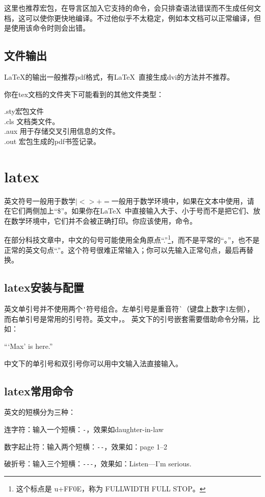 	这里也推荐宏包，在导言区加入它支持的命令，会只排查语法错误而不生成任何文档，这可以使你更快地编译。不过他似乎不太稳定，例如本文档可以正常编译，但是使用该命令时则会出错。
\subsection{文件输出}
	\LaTeX{}的输出一般推荐pdf格式，有\LaTeX\ 直接生成dvi的方法并不推荐。

你在tex文档的文件夹下可能看到的其他文件类型：
\begin{tabbing}
	.sty{\hspace{2em}}\=宏包文件\\%
	.cls	\> 文档类文件。\\
	.aux	\> 用于存储交叉引用信息的文件。\\
	.out	\> 宏包生成的pdf书签记录。
\end{tabbing}
\section{latex}
	英文符号一般用于数学$|<>+=$一般用于数学环境中，如果在文本中使用，请在它们两侧加上“\$”。如果你在\LaTeX\ 中直接输入大于、小于号而不是把它们、放在数学环境中，它们并不会被正确打印。你应该使用，命令。

	在部分科技文章中，中文的句号可能使用全角原点“.”\footnote{这个标点是 u+FF0E，称为 FULLWIDTH FULL STOP。}，而不是平常的“。”，也不是正常的英文句点“.”。这个符号很难正常输入；你可以先输入正常句点，最后再替换。
	\subsection{latex安装与配置}
	英文单引号并不使用两个\verb|'|符号组合。左单引号是重音符\verb|`|（键盘上数字1左侧），而右单引号是常用的引号符。英文中，{\color{cyan}{左双引号就是连续两个重音符号}}。
	英文下的引号嵌套需要借助命令分隔，比如：
\begin{codeshow}[listing side text, listing options={escapeinside=++}]%
``\thinspace`Max' is here.''
\end{codeshow}
中文下的单引号和双引号你可以用中文输入法直接输入。

\subsection{latex常用命令}
英文的短横分为三种：
\begin{feai}
\item 连字符：输入一个短横：\verb|-|，效果如daughter-in-law
\item 数字起止符：输入两个短横：\verb|--|，效果如：page 1--2
\item 破折号：输入三个短横：\verb|---|，效果如：Listen---I'm serious.
\end{feai}

